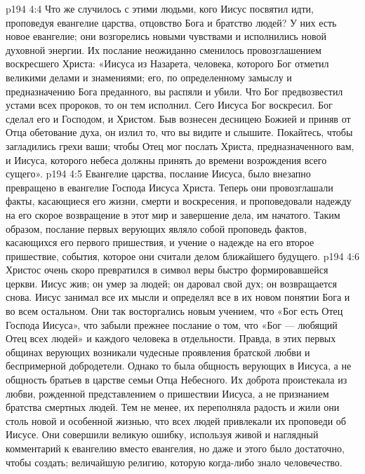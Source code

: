\vs p194 4:4 \pc Что же случилось с этими людьми, кого Иисус посвятил идти, проповедуя евангелие царства, отцовство Бога и братство людей? У них есть новое евангелие; они возгорелись новыми чувствами и исполнились новой духовной энергии. Их послание неожиданно сменилось провозглашением воскресшего Христа: «Иисуса из Назарета, человека, которого Бог отметил великими делами и знамениями; его, по определенному замыслу и предназначению Бога преданного, вы распяли и убили. Что Бог предвозвестил устами всех пророков, то он тем исполнил. Сего Иисуса Бог воскресил. Бог сделал его и Господом, и Христом. Быв вознесен десницею Божией и приняв от Отца обетование духа, он излил то, что вы видите и слышите. Покайтесь, чтобы загладились грехи ваши; чтобы Отец мог послать Христа, предназначенного вам, и Иисуса, которого небеса должны принять до времени возрождения всего сущего».
\vs p194 4:5 Евангелие царства, послание Иисуса, было внезапно превращено в евангелие Господа Иисуса Христа. Теперь они провозглашали факты, касающиеся его жизни, смерти и воскресения, и проповедовали надежду на его скорое возвращение в этот мир и завершение дела, им начатого. Таким образом, послание первых верующих являло собой проповедь фактов, касающихся его первого пришествия, и учение о надежде на его второе пришествие, события, которое они считали делом ближайшего будущего.
\vs p194 4:6 Христос очень скоро превратился в символ веры быстро формировавшейся церкви. Иисус жив; он умер за людей; он даровал свой дух; он возвращается снова. Иисус занимал все их мысли и определял все в их новом понятии Бога и во всем остальном. Они так восторгались новым учением, что «Бог есть Отец Господа Иисуса», что забыли прежнее послание о том, что «Бог --- любящий Отец всех людей» и каждого человека в отдельности. Правда, в этих первых общинах верующих возникали чудесные проявления братской любви и беспримерной добродетели. Однако то была общность верующих в Иисуса, а не общность братьев в царстве семьи Отца Небесного. Их доброта проистекала из любви, рожденной представлением о пришествии Иисуса, а не признанием братства смертных людей. Тем не менее, их переполняла радость и жили они столь новой и особенной жизнью, что всех людей привлекали их проповеди об Иисусе. Они совершили великую ошибку, используя живой и наглядный комментарий к евангелию вместо евангелия, но даже и этого было достаточно, чтобы создать; величайшую религию, которую когда\hyp{}либо знало человечество.
